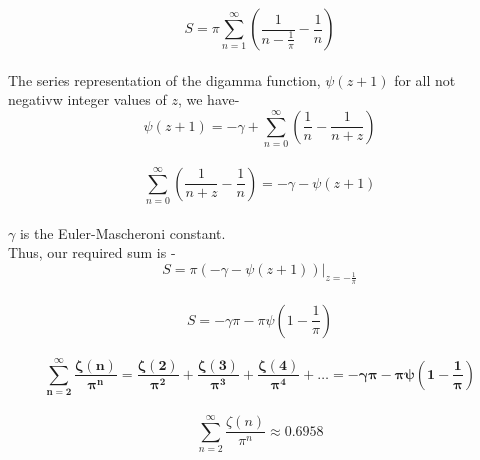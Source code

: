 \documentclass{article}
\begin{document}
$$S=\pi\sum_{n=1}^{\infty}\left(\frac{1}{n-\frac{1}{\pi}}-\frac{1}{n}\right)$$\\[10pt]
The series representation of the digamma function, $\psi(z+1)$ for all not negativw integer values of $z$, we have-\\[10pt]
$$\psi(z+1)=-\gamma+\sum_{n=0}^{\infty}\left(\frac{1}{n}-\frac{1}{n+z}\right)$$\\[10pt]
$$\sum_{n=0}^{\infty}\left(\frac{1}{n+z}-\frac{1}{n}\right)=-\gamma-\psi(z+1)$$\\[10pt]
$\gamma$ is the Euler-Mascheroni constant.\\[10pt]
Thus, our required sum is -\\[10pt]
$$S=\pi\left(-\gamma-\psi(z+1)\right)\Big|_{z=-\frac{1}{\pi}}$$\\[10pt]
$$S=-\gamma\pi-\pi\psi(1-\frac{1}{\pi})$$\\[10pt]
$$\boxed{\mathbf{\sum_{n=2}^{\infty}\frac{\zeta(n)}{\pi^n}=\frac{\zeta(2)}{\pi^2}+\frac{\zeta(3)}{\pi^3}+\frac{\zeta(4)}{\pi^4}+\ldots=-\gamma\pi-\pi\psi(1-\frac{1}{\pi})}}$$\\[10pt]
$$\sum_{n=2}^{\infty}\frac{\zeta(n)}{\pi^n}\approx 0.6958$$
\end{document}
